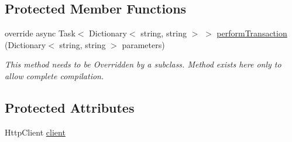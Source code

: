 \subsection*{Protected Member Functions}
\begin{DoxyCompactItemize}
\item 
override async Task$<$ Dictionary$<$ string, string $>$ $>$ \mbox{\hyperlink{class_form_sim_1_1_h_t_t_p_handler_a1b87e232c94cf390f7a9656744006639}{perform\+Transaction}} (Dictionary$<$ string, string $>$ parameters)
\begin{DoxyCompactList}\small\item\em This method needs to be Overridden by a subclass. Method exists here only to allow complete compilation. \end{DoxyCompactList}\end{DoxyCompactItemize}
\subsection*{Protected Attributes}
\begin{DoxyCompactItemize}
\item 
Http\+Client \mbox{\hyperlink{class_form_sim_1_1_h_t_t_p_handler_a1ce7f8f2407501a53c791cc6323ea5c7}{client}}
\end{DoxyCompactItemize}
